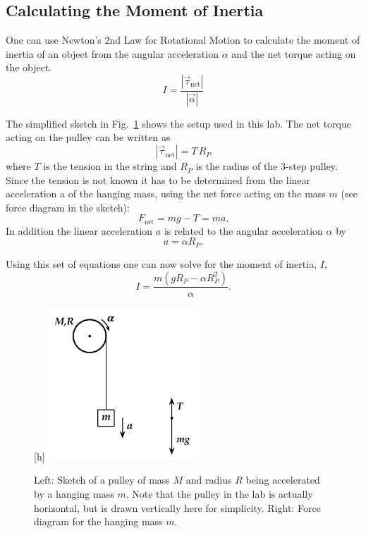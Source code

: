 \pagebreak 
\subsection{Calculating the Moment of Inertia}

One can use Newton's 2nd Law for Rotational Motion to calculate the moment of inertia of an object from the angular acceleration $\alpha$ and the net torque acting on the object.
\[
I = \frac{\left|\vec{\tau}_{\mbox{net}}\right|}{\left|\vec{\alpha}\right|}
\]



The simplified sketch in Fig.~\ref{M08Fig01} shows the setup used in this lab.
The net torque acting on the pulley can be written as
\[
|\vec{\tau}_{\mbox{net}}| = T \, R_{P}
\]
where $T$ is the tension in the string and $R_{P}$ is the radius of the 3-step pulley. Since the tension is not known it has to be determined from the linear acceleration a of the hanging mass, using the net force acting on the mass $m$ (see force diagram in the sketch):
\[
F_{\mbox{net}} = m g - T = m a.
\]
In addition the linear acceleration $a$ is related to the angular acceleration $\alpha$ by
\[
a = \alpha R_{P}.
\]

Using this set of equations one can now solve for the moment of inertia, $I$,
\begin{equation}
  \label{eq:M08Eq03}
  I = \frac{m \left(g  R_{P} - \alpha R_{P}^2\right)}{\alpha}.
\end{equation}


\begin{figure}
  \begin{center}[h]
    \includegraphics[width=2.2in]{Experiment09Figures/Figure01.pdf}
  \end{center}
  \caption{Left: Sketch of a pulley of mass $M$ and radius $R$ being accelerated by a hanging mass $m$. Note that the pulley in the lab is actually horizontal, but is drawn vertically here for simplicity. Right: Force diagram for the hanging mass $m$.}
  \label{M08Fig01}  %
\end{figure}





